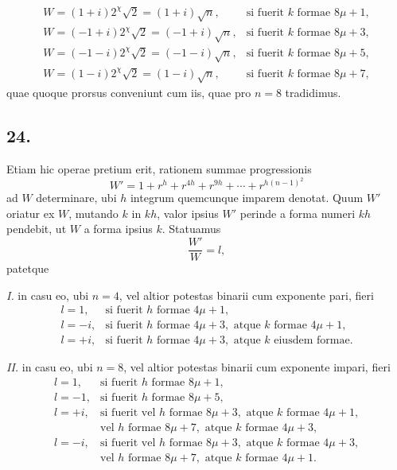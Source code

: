 \documentclass[12pt]{article}
\begin{document}
\[
\begin{array}{ll}
W=(1+i)2^\chi\sqrt2=(1+i)\sqrt n, & \text{si fuerit }k\text{ formae }8\mu+1,\\
W=(-1+i)2^\chi\sqrt2=(-1+i)\sqrt n, & \text{si fuerit }k\text{ formae }8\mu+3,\\
W=(-1-i)2^\chi\sqrt2=(-1-i)\sqrt n, & \text{si fuerit }k\text{ formae }8\mu+5,\\
W=(1-i)2^\chi\sqrt2=(1-i)\sqrt n, & \text{si fuerit }k\text{ formae }8\mu+7,
\end{array}
\]
quae quoque prorsus conveniunt cum iis, quae pro $n=8$ tradidimus.

\subsection*{24.}

Etiam hic operae pretium erit, rationem summae progressionis
\[
W'=1+r^h+r^{4h}+r^{9h}+\cdots+r^{h(n-1)^2}
\]
ad $W$ determinare, ubi $h$ integrum quemcunque imparem denotat. Quum $W'$ oriatur ex $W$, mutando $k$ in $kh$, valor ipsius $W'$ perinde a forma numeri $kh$ pendebit, ut $W$ a forma ipsius $k$. Statuamus
\[
\frac{W'}{W}=l,
\]
patetque

\emph{I.} in casu eo, ubi $n=4$, vel altior potestas binarii cum exponente pari, fieri
\[
\begin{array}{ll}
l=1, & \text{si fuerit }h\text{ formae }4\mu+1,\\
l=-i, & \text{si fuerit }h\text{ formae }4\mu+3,\text{ atque }k\text{ formae }4\mu+1,\\
l=+i, & \text{si fuerit }h\text{ formae }4\mu+3,\text{ atque }k\text{ eiusdem formae.}
\end{array}
\]

\emph{II.} in casu eo, ubi $n=8$, vel altior potestas binarii cum exponente impari, fieri
\[
\begin{array}{ll}
l=1, & \text{si fuerit }h\text{ formae }8\mu+1,\\
l=-1, & \text{si fuerit }h\text{ formae }8\mu+5,\\
l=+i, & \text{si fuerit vel }h\text{ formae }8\mu+3,\text{ atque }k\text{ formae }4\mu+1,\\
&\text{vel }h\text{ formae }8\mu+7,\text{ atque }k\text{ formae }4\mu+3,\\
l=-i, & \text{si fuerit vel }h\text{ formae }8\mu+3,\text{ atque }k\text{ formae }4\mu+3,\\
&\text{vel }h\text{ formae }8\mu+7,\text{ atque }k\text{ formae }4\mu+1.
\end{array}
\]
\end{document}
